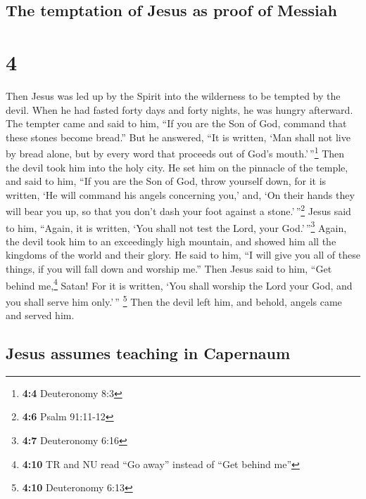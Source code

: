 \hypertarget{the-temptation-of-jesus-as-proof-of-messiah}{%
\subsection{The temptation of Jesus as proof of
Messiah}\label{the-temptation-of-jesus-as-proof-of-messiah}}

\hypertarget{section-3}{%
\section{4}\label{section-3}}

 Then Jesus was led up by the Spirit into the wilderness
to be tempted by the devil.  When he had fasted forty days
and forty nights, he was hungry afterward.  The tempter
came and said to him, ``If you are the Son of God, command that these
stones become bread.''  But he answered, ``It is written,
`Man shall not live by bread alone, but by every word that proceeds out
of God's mouth.'\,''\footnote{\textbf{4:4} Deuteronomy 8:3}
 Then the devil took him into the holy city. He set him on
the pinnacle of the temple,  and said to him, ``If you are
the Son of God, throw yourself down, for it is written, `He will command
his angels concerning you,' and, `On their hands they will bear you up,
so that you don't dash your foot against a stone.'\,''\footnote{\textbf{4:6}
  Psalm 91:11-12}  Jesus said to him, ``Again, it is
written, `You shall not test the Lord, your God.'\,''\footnote{\textbf{4:7}
  Deuteronomy 6:16}  Again, the devil took him to an
exceedingly high mountain, and showed him all the kingdoms of the world
and their glory.  He said to him, ``I will give you all of
these things, if you will fall down and worship me.'' 
Then Jesus said to him, ``Get behind me,\footnote{\textbf{4:10} TR and
  NU read ``Go away'' instead of ``Get behind me''} Satan! For it is
written, `You shall worship the Lord your God, and you shall serve him
only.'\,'' \footnote{\textbf{4:10} Deuteronomy 6:13} 
Then the devil left him, and behold, angels came and served him.

\hypertarget{jesus-assumes-teaching-in-capernaum}{%
\subsection{Jesus assumes teaching in
Capernaum}\label{jesus-assumes-teaching-in-capernaum}}

